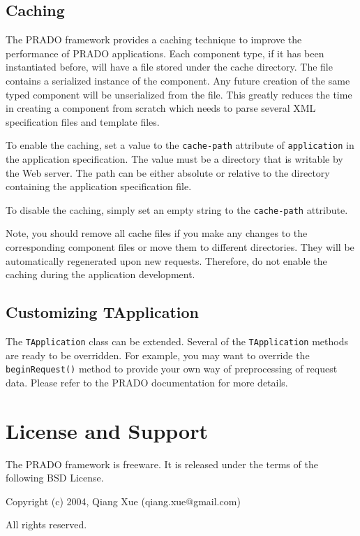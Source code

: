 \documentclass{book}
\begin{document}
\section{Caching}

The PRADO framework provides a caching technique to improve the
performance of PRADO applications. Each component type, if it has
been instantiated before, will have a file stored under the cache
directory. The file contains a serialized instance of the
component. Any future creation of the same typed component will be
unserialized from the file. This greatly reduces the time in
creating a component from scratch which needs to parse several XML
specification files and template files.


To enable the caching, set a value to the \verb|cache-path|
attribute of \verb|application| in the application specification.
The value must be a directory that is writable by the Web server.
The path can be either absolute or relative to the directory
containing the application specification file.

To disable the caching, simply set an empty string to the
\verb|cache-path| attribute.

Note, you should remove all cache files if you make any changes to
the corresponding component files or move them to different
directories. They will be automatically regenerated upon new
requests. Therefore, do not enable the caching during the
application development.


\section{Customizing TApplication}

The \verb|TApplication| class can be extended. Several of the
\verb|TApplication| methods are ready to be overridden. For
example, you may want to override the \verb|beginRequest()| method
to provide your own way of preprocessing of request data. Please
refer to the PRADO documentation for more details.


\chapter{License and Support}

The PRADO framework is freeware. It is released under the terms of
the following BSD License.

Copyright (c) 2004, Qiang Xue (qiang.xue@gmail.com)

All rights reserved.
\end{document}
